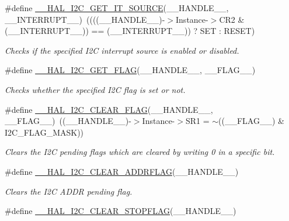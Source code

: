 \begin{DoxyCompactItemize}
\item 
\#define \hyperlink{group___i2_c___exported___macros_ga932024bf4a259e0cdaf9e50b38e3d41a}{\+\_\+\+\_\+\+H\+A\+L\+\_\+\+I2\+C\+\_\+\+G\+E\+T\+\_\+\+I\+T\+\_\+\+S\+O\+U\+R\+CE}(\+\_\+\+\_\+\+H\+A\+N\+D\+L\+E\+\_\+\+\_\+,  \+\_\+\+\_\+\+I\+N\+T\+E\+R\+R\+U\+P\+T\+\_\+\+\_\+)~((((\+\_\+\+\_\+\+H\+A\+N\+D\+L\+E\+\_\+\+\_\+)-\/$>$Instance-\/$>$C\+R2 \& (\+\_\+\+\_\+\+I\+N\+T\+E\+R\+R\+U\+P\+T\+\_\+\+\_\+)) == (\+\_\+\+\_\+\+I\+N\+T\+E\+R\+R\+U\+P\+T\+\_\+\+\_\+)) ? S\+ET \+: R\+E\+S\+ET)
\begin{DoxyCompactList}\small\item\em Checks if the specified I2C interrupt source is enabled or disabled. \end{DoxyCompactList}\item 
\#define \hyperlink{group___i2_c___exported___macros_gafbdf01a7dc3183de7af56456cab93551}{\+\_\+\+\_\+\+H\+A\+L\+\_\+\+I2\+C\+\_\+\+G\+E\+T\+\_\+\+F\+L\+AG}(\+\_\+\+\_\+\+H\+A\+N\+D\+L\+E\+\_\+\+\_\+,  \+\_\+\+\_\+\+F\+L\+A\+G\+\_\+\+\_\+)
\begin{DoxyCompactList}\small\item\em Checks whether the specified I2C flag is set or not. \end{DoxyCompactList}\item 
\#define \hyperlink{group___i2_c___exported___macros_ga933e2ea67e86db857a06b70a93be1186}{\+\_\+\+\_\+\+H\+A\+L\+\_\+\+I2\+C\+\_\+\+C\+L\+E\+A\+R\+\_\+\+F\+L\+AG}(\+\_\+\+\_\+\+H\+A\+N\+D\+L\+E\+\_\+\+\_\+,  \+\_\+\+\_\+\+F\+L\+A\+G\+\_\+\+\_\+)~((\+\_\+\+\_\+\+H\+A\+N\+D\+L\+E\+\_\+\+\_\+)-\/$>$Instance-\/$>$S\+R1 = $\sim$((\+\_\+\+\_\+\+F\+L\+A\+G\+\_\+\+\_\+) \& I2\+C\+\_\+\+F\+L\+A\+G\+\_\+\+M\+A\+SK))
\begin{DoxyCompactList}\small\item\em Clears the I2C pending flags which are cleared by writing 0 in a specific bit. \end{DoxyCompactList}\item 
\#define \hyperlink{group___i2_c___exported___macros_ga15a0a1a04971d44f9a1b82cab10af24f}{\+\_\+\+\_\+\+H\+A\+L\+\_\+\+I2\+C\+\_\+\+C\+L\+E\+A\+R\+\_\+\+A\+D\+D\+R\+F\+L\+AG}(\+\_\+\+\_\+\+H\+A\+N\+D\+L\+E\+\_\+\+\_\+)
\begin{DoxyCompactList}\small\item\em Clears the I2C A\+D\+DR pending flag. \end{DoxyCompactList}\item 
\#define \hyperlink{group___i2_c___exported___macros_gae8e94c16809df16411862b11fea781db}{\+\_\+\+\_\+\+H\+A\+L\+\_\+\+I2\+C\+\_\+\+C\+L\+E\+A\+R\+\_\+\+S\+T\+O\+P\+F\+L\+AG}(\+\_\+\+\_\+\+H\+A\+N\+D\+L\+E\+\_\+\+\_\+)

\end{DoxyCompactItemize}
